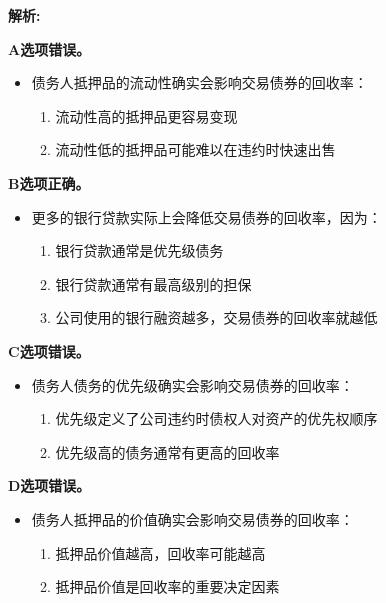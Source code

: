 \documentclass{article}
\newenvironment{explanation}
{\textbf{解析:}\par}
{\par}
\begin{document}
\begin{explanation}
    \textbf{A选项错误。}
    \begin{itemize}
        \item 债务人抵押品的流动性确实会影响交易债券的回收率：
        \begin{enumerate}
            \item 流动性高的抵押品更容易变现
            \item 流动性低的抵押品可能难以在违约时快速出售
        \end{enumerate}
    \end{itemize}
    
    \textbf{B选项正确。}
    \begin{itemize}
        \item 更多的银行贷款实际上会降低交易债券的回收率，因为：
        \begin{enumerate}
            \item 银行贷款通常是优先级债务
            \item 银行贷款通常有最高级别的担保
            \item 公司使用的银行融资越多，交易债券的回收率就越低
        \end{enumerate}
    \end{itemize}
    
    \textbf{C选项错误。}
    \begin{itemize}
        \item 债务人债务的优先级确实会影响交易债券的回收率：
        \begin{enumerate}
            \item 优先级定义了公司违约时债权人对资产的优先权顺序
            \item 优先级高的债务通常有更高的回收率
        \end{enumerate}
    \end{itemize}
    
    \textbf{D选项错误。}
    \begin{itemize}
        \item 债务人抵押品的价值确实会影响交易债券的回收率：
        \begin{enumerate}
            \item 抵押品价值越高，回收率可能越高
            \item 抵押品价值是回收率的重要决定因素
        \end{enumerate}
    \end{itemize}
\end{explanation}
\end{document}
